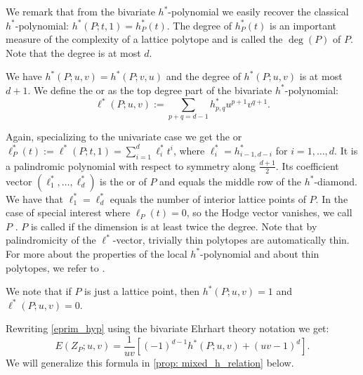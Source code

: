 \documentclass[reqno, 11pt, a4paper, oneside]{amsart}
\begin{document}
We remark that from the bivariate $h^*$-polynomial we easily recover the classical $h^*$-polynomial: $h^*(P;t,1) = h^*_P(t)$. 
The degree of $h^*_P(t)$ is an important measure of the complexity of a lattice polytope and is called the  $\deg(P)$ of $P$. Note that the degree is at most $d$.

We have $h^*(P;u,v) = h^*(P;v,u)$ and the degree of $h^*(P;u,v)$ is at most $d+1$. We define the  or  as the top degree part of the bivariate $h^*$-polynomial:
\[\ell^*(P;u,v) := \sum_{p+q = d-1} h^*_{p,q} u^{p+1} v^{q+1}.\]

Again, specializing to the univariate case we get the  or  $\ell^*_P(t) := \ell^*(P;t,1) = \sum_{i=1}^d \ell^*_i t^i$, where $\ell^*_i=h^*_{i-1,d-i}$ for $i=1, \ldots, d$. It is a palindromic polynomial with respect to symmetry along $\frac{d+1}{2}$. Its coefficient vector $(\ell^*_1, \ldots, \ell^*_d)$ is the  or  of $P$ and equals the middle row of the $h^*$-diamond. We have that $\ell^*_1=\ell^*_d$ equals the number of interior lattice points of $P$. In the case of special interest where $\ell_P(t)=0$, so the Hodge vector vanishes, we call $P$ . $P$ is called  if the dimension is at least twice the degree. Note that by palindromicity of the $\ell^*$-vector, trivially thin polytopes are automatically thin. For more about the properties of the local $h^*$-polynomial and about thin polytopes, we refer to \cite{borger_thin_2023}.

We note that if $P$ is just a lattice point, then $h^*(P;u,v)=1$ and $\ell^*(P;u,v)=0$.

\smallskip

Rewriting \eqref{eprim_hyp} using the bivariate Ehrhart theory notation we get:
\begin{equation}  E(Z_P; u,v) = \frac{1}{uv} \left[(-1)^{d-1} h^*(P; u,v) + (uv- 1)^{d} \right].
\label{E-hyper}
\end{equation}
We will generalize this formula in \cref{prop: mixed_h_relation} below.
\end{document}
